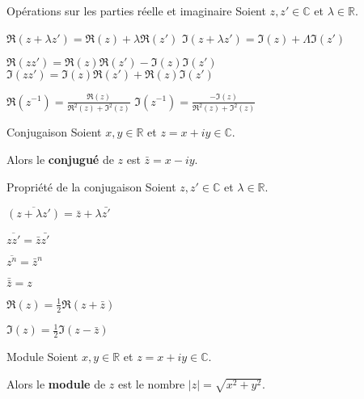     \begin{prop}{Opérations sur les parties réelle et imaginaire}{}
	    Soient $z,z' \in \mathbb{C}$ et $\lambda \in \mathbb{R}$.

	    \begin{alors}
		    \item $\Re(z + \lambda z') = \Re(z) + \lambda \Re(z')$ \newline $\Im(z + \lambda z') = \Im(z) + \Lambda \Im(z')$
		    \item $\Re(zz') = \Re(z) \Re(z') - \Im(z) \Im(z')$ \newline $\Im(zz') = \Im(z) \Re(z') + \Re(z) \Im(z')$
		    \item $\Re(z^{-1}) = \frac{\Re(z)}{\Re^2(z) + \Im^2(z)}$ \newline  $\Im(z^{-1}) = \frac{-\Im(z)}{\Re^2(z) + \Im^2(z)}$
	    \end{alors}
    \end{prop}

    \begin{defi}{Conjugaison}{}
        Soient $x,y \in \mathbb{R}$ et $z = x + iy \in \mathbb{C}$.
    
        Alors le \textbf{conjugué} de $z$ est $\bar{z} = x - iy$.
    \end{defi}

    \begin{prop}{Propriété de la conjugaison}{}
        Soient $z,z' \in \mathbb{C}$ et $\lambda \in \mathbb{R}$.
    
        \begin{alors}
            \item $\overline{(z + \lambda z')} = \bar{z} + \lambda \bar{z'}$
            \item $\overline{zz'} = \bar{z} \bar{z'}$
            \item $\overline{z^n} = \bar{z}^n$
            \item $\bar{\bar{z}} = z$
            \item $\Re(z) = \frac{1}{2} \Re(z + \bar{z})$
            \item $\Im(z) = \frac{1}{2} \Im(z - \bar{z})$
        \end{alors}
    \end{prop}

    \begin{defi}{Module}{}
        Soient $x,y \in \mathbb{R}$ et $z = x + iy \in \mathbb{C}$.
    
        Alors le \textbf{module} de $z$ est le nombre $|z| = \sqrt{x^2 + y^2}$.
    \end{defi}

